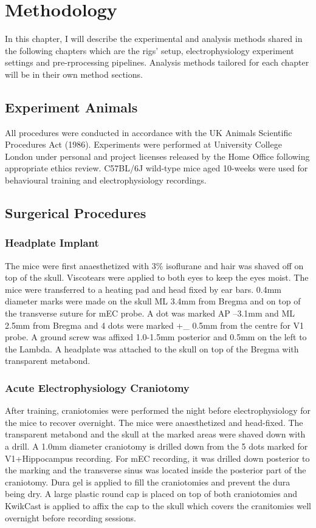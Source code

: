 \chapter{Methodology}
\label{chapterlabel2}

In this chapter, I will describe the experimental and analysis methods shared in the following chapters which are the rigs' setup, electrophysiology experiment settings and pre-rprocessing pipelines. Analysis methods tailored for each chapter will be in their own method sections. 

\section{Experiment Animals}
All procedures were conducted in accordance with the UK Animals Scientific Procedures Act (1986). Experiments were performed at University College London under personal and project licenses released by the Home Office following appropriate ethics review. C57BL/6J wild-type mice aged 10-weeks were used for behavioural training and electrophysiology recordings.

\section{ Surgerical Procedures}

\subsection{Headplate Implant}

The mice were first anaesthetized with 3\% isoflurane and hair was shaved off on top of the skull. Viscotears were applied to both eyes to keep the eyes moist. The mice were transferred to a heating pad and head fixed by ear bars. 0.4mm diameter marks were made on the skull ML 3.4mm from Bregma and on top of the transverse suture for mEC probe. A dot was marked AP –3.1mm and ML 2.5mm from Bregma and 4 dots were marked +\_ 0.5mm from the centre for V1 probe. A ground screw was affixed 1.0-1.5mm posterior and 0.5mm on the left to the Lambda. A headplate was attached to the skull on top of the Bregma with transparent metabond. 

\subsection{Acute Electrophysiology Craniotomy}

After training, craniotomies were performed the night before electrophysiology for the mice to recover overnight. The mice were anaesthetized and head-fixed. The transparent metabond and the skull at the marked areas were shaved down with a drill. A 1.0mm diameter craniotomy is drilled down from the 5 dots marked for V1+Hippocampus recording. For mEC recording, it was drilled down posterior to the marking and the transverse sinus was located inside the posterior part of the craniotomy. Dura gel is applied to fill the craniotomies and prevent the dura being dry. A large plastic round cap is placed on top of both craniotomies and KwikCast is applied to affix the cap to the skull which covers the cranitomies well overnight before recording sessions. 

